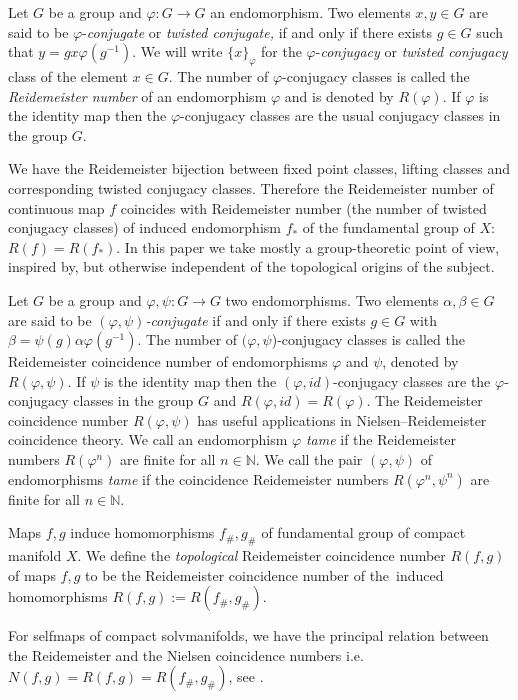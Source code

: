\documentclass[oneside]{amsart}
\begin{document}
Let $G$ be a  group and $\varphi: G\rightarrow G$ an
endomorphism. Two elements $x,y\in G$ are said to be
$\varphi$-{\em conjugate} or {\em twisted conjugate,}
if and only if there exists $g \in G$ such that $ y=g  x   \varphi(g^{-1}).$
We will write $\{x\}_\varphi$ for the $\varphi$-{\em conjugacy} or
{\em twisted conjugacy} class
of the element $x\in G$.
The number of $\varphi$-conjugacy classes is called the {\em Reidemeister number}
of an  endomorphism $\varphi$ and is  denoted by $R(\varphi)$.
If $\varphi$ is the identity map then the $\varphi$-conjugacy classes are the usual
conjugacy classes in the group $G$.


We have the Reidemeister bijection between  fixed point classes, lifting classes and corresponding twisted conjugacy
classes. Therefore the
Reidemeister number of continuous map  $f$ coincides with Reidemeister number
(the number of twisted conjugacy classes) of induced endomorphism $f_*$ of the fundamental group of $X$: $R(f)=R(f_*)$.
In this paper we take mostly a group-theoretic point of view,
inspired by, but otherwise  independent of the topological
origins of the subject.

Let $G$ be a  group and $\varphi, \psi : G\rightarrow G$
two endomorphisms. Two elements $\alpha,\beta\in G$ are said to be $(\varphi, \psi)$\textit{-conjugate} if and only if there exists $g \in G$ with
$
\beta=\psi(g)  \alpha   \varphi(g^{-1}).
$
The number of $(\varphi,\psi$)-conjugacy classes is called the Reidemeister coincidence
number of   endomorphisms $\varphi $ and $\psi $, denoted by $ R(\varphi,\psi)$. If $\psi$ is the identity map then the $(\varphi,id)$-conjugacy classes are the $\varphi$-conjugacy classes in the group $G$ and $R(\varphi,id) = R(\varphi)$.
The Reidemeister coincidence number $R(\varphi,\psi)$ has useful applications in Nielsen--Reidemeister  coincidence theory.
We call an  endomorphism $\varphi$  \emph{tame} if the
Reidemeister numbers $R(\varphi^n)$ are finite for all $n \in
\mathbb{N}$.
We call the pair $(\varphi,\psi)$ of endomorphisms \emph{tame} if the coincidence
Reidemeister numbers $R(\varphi^n,\psi^n)$ are finite for all $n \in
\mathbb{N}$.

Maps $f,g$ induce homomorphisms $f_\#, g_\#$  of  fundamental group of compact manifold $X$.
We define the \emph{topological} Reidemeister coincidence number  $R(f,g)$ of maps  $f,g$
to be the Reidemeister coincidence number of the~induced homomorphisms  $R(f,g) := R(f_\#,g_\#)$.

For selfmaps of compact solvmanifolds, we have the  principal relation between the Reidemeister  and the Nielsen  coincidence numbers i.e.
  $ N(f,g)=R(f,g)=R(f_\#,g_\#)$,  see \cite{GoWon}.
\end{document}
